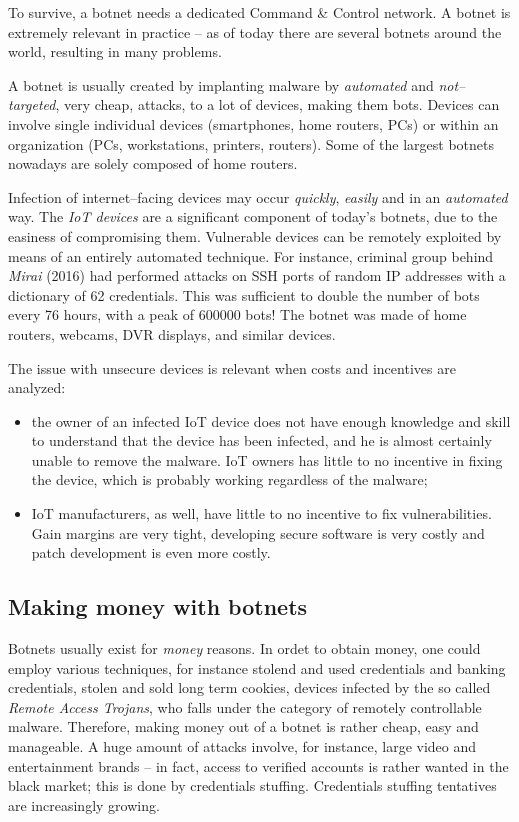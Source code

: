 \documentclass[10pt]{extbook}
\begin{document}
To survive, a botnet needs a dedicated Command \& Control network. A botnet is
extremely relevant in practice -- as of today there are several botnets around
the world, resulting in many problems.

A botnet is usually created by implanting malware by \emph{automated} and
\emph{not--targeted}, very cheap, attacks, to a lot of devices, making them
bots. Devices can involve single individual devices (smartphones, home routers,
PCs) or within an organization (PCs, workstations, printers, routers). Some of
the largest botnets nowadays are solely composed of home routers.

Infection of internet--facing devices may occur \emph{quickly}, \emph{easily}
and in an \emph{automated} way. The \emph{IoT devices} are a significant
component of today's botnets, due to the easiness of compromising them.
Vulnerable devices can be remotely exploited by means of an entirely automated
technique. For instance, criminal group behind \emph{Mirai} (2016) had
performed attacks on SSH ports of random IP addresses with a dictionary of 62
credentials. This was sufficient to double the number of bots every 76 hours,
with a peak of 600000 bots! The botnet was made of home routers, webcams, DVR
displays, and similar devices.

The issue with unsecure devices is relevant when costs and incentives are
analyzed:
\begin{itemize}
    \item the owner of an infected IoT device does not have enough knowledge
        and skill to understand that the device has been infected, and he is
        almost certainly unable to remove the malware. IoT owners has little to
        no incentive in fixing the device, which is probably working regardless
        of the malware;
    \item IoT manufacturers, as well, have little to no incentive to fix
        vulnerabilities. Gain margins are very tight, developing secure
        software is very costly and patch development is even more costly.
\end{itemize}


\subsection{Making money with botnets}

Botnets usually exist for \emph{money} reasons. In ordet to obtain money, one
could employ various techniques, for instance stolend and used credentials and
banking credentials, stolen and sold long term cookies, devices infected by the
so called \emph{Remote Access Trojans}, who falls under the category of
remotely controllable malware. Therefore, making money out of a botnet is
rather cheap, easy and manageable. A huge amount of attacks involve, for
instance, large video and entertainment brands -- in fact, access to verified
accounts is rather wanted in the black market; this is done by credentials
stuffing. Credentials stuffing tentatives are increasingly growing. 
\end{document}
